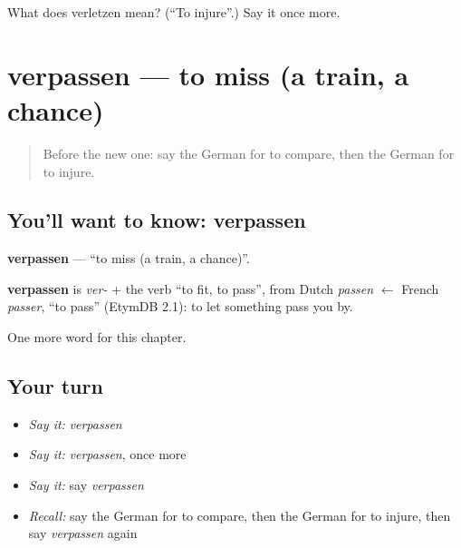 \begin{tcolorbox}[breakable,colback=teal!4,colframe=teal!35!black,title={Before you move on}]
What does verletzen mean? (\textquotedblleft{}To injure\textquotedblright{}.) Say it once more.
\end{tcolorbox}
\section[verpassen]{verpassen — to miss (a train, a chance)}

\label{lesson:GE-C190-verpassen}



\begin{quote}
Before the new one: say the German for to compare, then the German for to injure.
\end{quote}

\subsection*{You'll want to know: verpassen}
\textbf{verpassen} — \textquotedblleft{}to miss (a train, a chance)\textquotedblright{}.

\begin{cousinweb}
\textbf{verpassen} is \emph{ver-} + the verb \textquotedblleft{}to fit, to pass\textquotedblright{}, from Dutch \emph{passen} $\leftarrow$ French \emph{passer}, \textquotedblleft{}to pass\textquotedblright{} (EtymDB 2.1): to let something pass you by.
\end{cousinweb}

\begin{grammarlens}[title={What you've built}]
One more word for this chapter.
\end{grammarlens}

\subsection*{Your turn}
\begin{itemize}
\raggedright
  \item \emph{Say it:} \emph{verpassen}
  \item \emph{Say it:} \emph{verpassen}, once more
  \item \emph{Say it:} say \emph{verpassen}
  \item \emph{Recall:} say the German for to compare, then the German for to injure, then say \emph{verpassen} again
\end{itemize}


